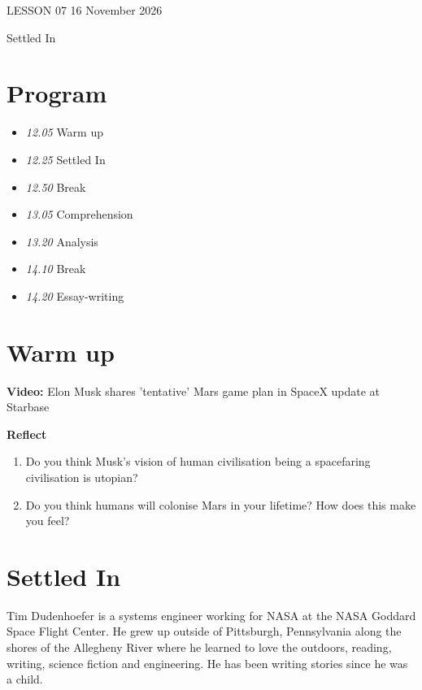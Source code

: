 \documentclass[11pt,a4paper,oneside]{book}
\newcommand{\tasktitle}[1]{{\color{blue}\bfseries #1}\par\smallskip}
\begin{document}
\clearpage{}
{\color{blue}\small LESSON 07 \hfill 16 November 2026\par}
\vspace{4mm}
{\displayfont\color{navy}\fontsize{30}{34}\selectfont Settled In\par}\vspace{4mm}

\section*{Program}

\begin{itemize}
\item \emph{12.05} Warm up
\item \emph{12.25} Settled In
\item \emph{12.50} Break
\item \emph{13.05} Comprehension
\item \emph{13.20} Analysis
\item \emph{14.10} Break
\item \emph{14.20} Essay-writing
\end{itemize}

\section*{Warm up}

\par\noindent\textbf{Video:} Elon Musk shares 'tentative' Mars game plan in SpaceX update at Starbase\par\medskip
\begin{taskbox}
\tasktitle{Reflect}
\begin{enumerate}
\item Do you think Musk's vision of human civilisation being a spacefaring civilisation is utopian?
\item Do you think humans will colonise Mars in your lifetime? How does this make you feel?
\end{enumerate}
\end{taskbox}

\section*{Settled In}
Tim Dudenhoefer is a systems engineer working for NASA at the NASA Goddard Space Flight Center. He grew up outside of Pittsburgh, Pennsylvania along the shores of the Allegheny River where he learned to love the outdoors, reading, writing, science fiction and engineering. He has been writing stories since he was a child.
\end{document}
